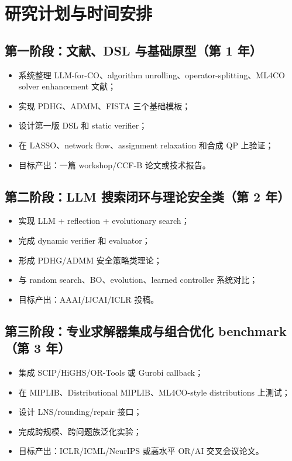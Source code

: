 \documentclass[UTF8,a4paper,12pt,fontset=fandol]{ctexart}
\begin{document}
\section{研究计划与时间安排}

\subsection{第一阶段：文献、DSL 与基础原型（第 1 年）}

\begin{itemize}[leftmargin=2em]
    \item 系统整理 LLM-for-CO、algorithm unrolling、operator-splitting、ML4CO solver enhancement 文献；
    \item 实现 PDHG、ADMM、FISTA 三个基础模板；
    \item 设计第一版 DSL 和 static verifier；
    \item 在 LASSO、network flow、assignment relaxation 和合成 QP 上验证；
    \item 目标产出：一篇 workshop/CCF-B 论文或技术报告。
\end{itemize}

\subsection{第二阶段：LLM 搜索闭环与理论安全类（第 2 年）}

\begin{itemize}[leftmargin=2em]
    \item 实现 LLM + reflection + evolutionary search；
    \item 完成 dynamic verifier 和 evaluator；
    \item 形成 PDHG/ADMM 安全策略类理论；
    \item 与 random search、BO、evolution、learned controller 系统对比；
    \item 目标产出：AAAI/IJCAI/ICLR 投稿。
\end{itemize}

\subsection{第三阶段：专业求解器集成与组合优化 benchmark（第 3 年）}

\begin{itemize}[leftmargin=2em]
    \item 集成 SCIP/HiGHS/OR-Tools 或 Gurobi callback；
    \item 在 MIPLIB、Distributional MIPLIB、ML4CO-style distributions 上测试；
    \item 设计 LNS/rounding/repair 接口；
    \item 完成跨规模、跨问题族泛化实验；
    \item 目标产出：ICLR/ICML/NeurIPS 或高水平 OR/AI 交叉会议论文。
\end{itemize}
\end{document}
